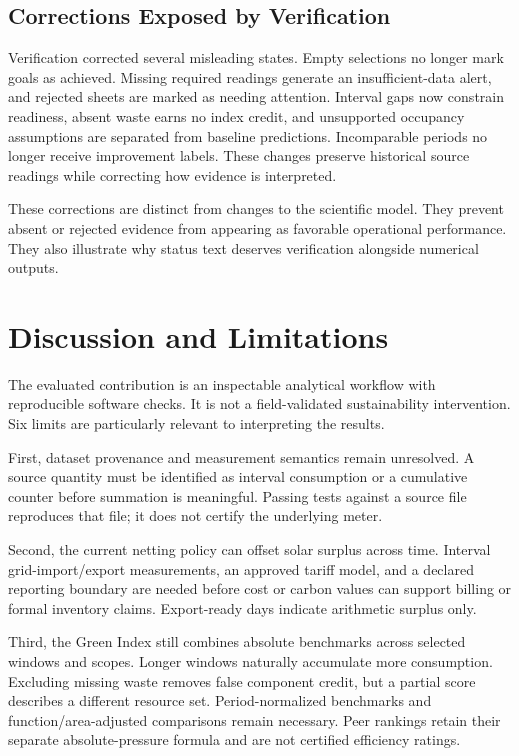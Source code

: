 \documentclass[conference]{IEEEtran}
\begin{document}
\subsection{Corrections Exposed by Verification}
Verification corrected several misleading states. Empty selections no longer mark goals as achieved. Missing required readings generate an insufficient-data alert, and rejected sheets are marked as needing attention. Interval gaps now constrain readiness, absent waste earns no index credit, and unsupported occupancy assumptions are separated from baseline predictions. Incomparable periods no longer receive improvement labels. These changes preserve historical source readings while correcting how evidence is interpreted.

These corrections are distinct from changes to the scientific model. They prevent absent or rejected evidence from appearing as favorable operational performance. They also illustrate why status text deserves verification alongside numerical outputs.

\section{Discussion and Limitations}
The evaluated contribution is an inspectable analytical workflow with reproducible software checks. It is not a field-validated sustainability intervention. Six limits are particularly relevant to interpreting the results.

First, dataset provenance and measurement semantics remain unresolved. A source quantity must be identified as interval consumption or a cumulative counter before summation is meaningful. Passing tests against a source file reproduces that file; it does not certify the underlying meter.

Second, the current netting policy can offset solar surplus across time. Interval grid-import/export measurements, an approved tariff model, and a declared reporting boundary are needed before cost or carbon values can support billing or formal inventory claims. Export-ready days indicate arithmetic surplus only.

Third, the Green Index still combines absolute benchmarks across selected windows and scopes. Longer windows naturally accumulate more consumption. Excluding missing waste removes false component credit, but a partial score describes a different resource set. Period-normalized benchmarks and function/area-adjusted comparisons remain necessary. Peer rankings retain their separate absolute-pressure formula and are not certified efficiency ratings.
\end{document}
